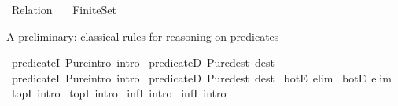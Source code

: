%
\begin{isabellebody}%
%
%
\isadelimdocument
%
\endisadelimdocument
%
\isatagdocument
%
\isamarkuptrue%
%
\endisatagdocument
{\isafolddocument}%
%
\isadelimdocument
%
\endisadelimdocument
%
\isadelimtheory
%
\endisadelimtheory
%
\isatagtheory
{}\isamarkupfalse%
\ Relation\isanewline
\ \ \ Finite{\isacharunderscore}{\kern0pt}Set\isanewline
{}%
\endisatagtheory
{\isafoldtheory}%
%
\isadelimtheory
%
\endisadelimtheory
%
\begin{isamarkuptext}%
A preliminary: classical rules for reasoning on predicates%
\end{isamarkuptext}\isamarkuptrue%
\isamarkupfalse%
\ predicate{}I\ {\isacharbrackleft}{\kern0pt}Pure{\isachardot}{\kern0pt}intro{\isacharbang}{\kern0pt}{\isacharcomma}{\kern0pt}\ intro{\isacharbang}{\kern0pt}{\isacharbrackright}{\kern0pt}\isanewline
{}\isamarkupfalse%
\ predicate{}D\ {\isacharbrackleft}{\kern0pt}Pure{\isachardot}{\kern0pt}dest{\isacharcomma}{\kern0pt}\ dest{\isacharbrackright}{\kern0pt}\isanewline
{}\isamarkupfalse%
\ predicate{}I\ {\isacharbrackleft}{\kern0pt}Pure{\isachardot}{\kern0pt}intro{\isacharbang}{\kern0pt}{\isacharcomma}{\kern0pt}\ intro{\isacharbang}{\kern0pt}{\isacharbrackright}{\kern0pt}\isanewline
{}\isamarkupfalse%
\ predicate{}D\ {\isacharbrackleft}{\kern0pt}Pure{\isachardot}{\kern0pt}dest{\isacharcomma}{\kern0pt}\ dest{\isacharbrackright}{\kern0pt}\isanewline
{}\isamarkupfalse%
\ bot{}E\ {\isacharbrackleft}{\kern0pt}elim{\isacharbang}{\kern0pt}{\isacharbrackright}{\kern0pt}\isanewline
{}\isamarkupfalse%
\ bot{}E\ {\isacharbrackleft}{\kern0pt}elim{\isacharbang}{\kern0pt}{\isacharbrackright}{\kern0pt}\isanewline
{}\isamarkupfalse%
\ top{}I\ {\isacharbrackleft}{\kern0pt}intro{\isacharbang}{\kern0pt}{\isacharbrackright}{\kern0pt}\isanewline
{}\isamarkupfalse%
\ top{}I\ {\isacharbrackleft}{\kern0pt}intro{\isacharbang}{\kern0pt}{\isacharbrackright}{\kern0pt}\isanewline
{}\isamarkupfalse%
\ inf{}I\ {\isacharbrackleft}{\kern0pt}intro{\isacharbang}{\kern0pt}{\isacharbrackright}{\kern0pt}\isanewline
{}\isamarkupfalse%
\ inf{}I\ {\isacharbrackleft}{\kern0pt}intro{\isacharbang}{\kern0pt}{\isacharbrackright}{\kern0pt}\isanewline

\end{isabellebody}
